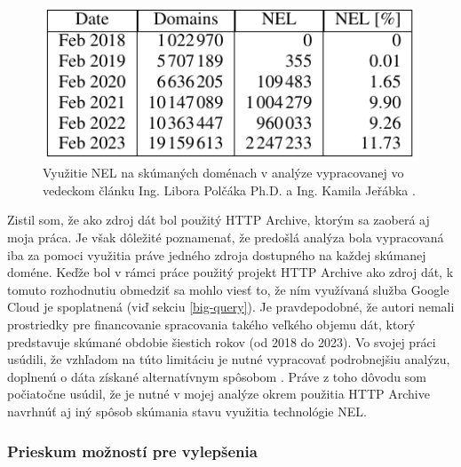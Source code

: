 \begin{figure}[!htb]
\begin{center}
    \includegraphics[width=0.55\linewidth]{obrazky-figures/polcak-analysis-hd.pdf}
    \caption{\centering Využitie NEL na skúmaných doménach v analýze vypracovanej vo vedeckom článku Ing. Libora Polčáka Ph.D. a Ing. Kamila Jeřábka \cite{nel-http-archive}.}
    \label{fig:polcak-analysis}
\end{center}
\end{figure}

\pagebreak

Zistil som, že ako zdroj dát bol použitý HTTP Archive, ktorým sa zaoberá aj moja práca.
Je však dôležité poznamenať, že predošlá analýza bola vypracovaná iba za pomoci využitia 
práve jedného zdroja dostupného na každej skúmanej doméne.
Keďže bol v rámci práce použitý projekt HTTP Archive ako zdroj dát, k tomuto rozhodnutiu obmedziť sa mohlo viesť to, 
že ním využívaná služba Google Cloud je spoplatnená (viď sekciu \ref{big-query}). 
Je pravdepodobné, že autori nemali prostriedky pre financovanie spracovania takého veľkého objemu dát, 
ktorý predstavuje skúmané obdobie šiestich rokov (od 2018 do 2023).
Vo svojej práci usúdili, že vzhľadom na túto limitáciu je nutné vypracovať podrobnejšiu analýzu, 
doplnenú o dáta získané alternatívnym spôsobom \cite{nel-http-archive}.
Práve z toho dôvodu som počiatočne usúdil, že je nutné v mojej analýze okrem použitia HTTP Archive navrhnúť 
aj iný spôsob skúmania stavu využitia technológie NEL.

\subsubsection{Prieskum možností pre vylepšenia}

